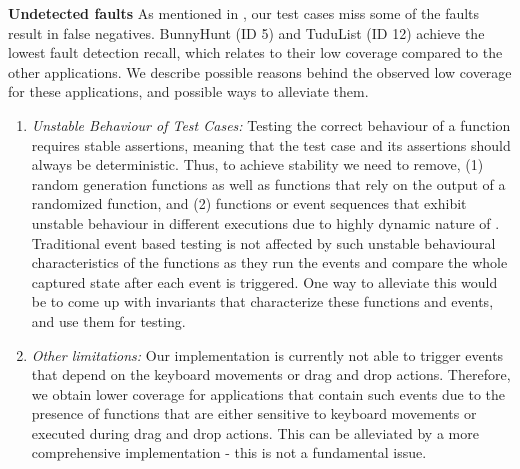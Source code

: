 \textbf{Undetected faults} As mentioned in , our test cases miss some of the faults \ie result in false negatives. 
BunnyHunt (ID 5) and TuduList (ID 12) achieve the lowest fault detection recall, which relates to their low coverage compared to the other applications. 
We describe possible reasons behind the observed low coverage for these applications, and possible ways to alleviate them.  
\begin{enumerate}
\item \textit{Unstable Behaviour of Test Cases:} Testing the correct behaviour of a function requires stable assertions, meaning that
 the test case and its assertions should always be deterministic. 
Thus, to achieve stability we need to remove, (1)  random generation functions as well as functions that rely on the output of a randomized function, and (2) functions or event sequences that exhibit unstable behaviour in different executions due to highly dynamic nature of \javascript. 
Traditional event based testing is not affected by such unstable behavioural characteristics of the functions as they run the events and compare the whole captured state after each event is triggered. One way to alleviate this would be to come up with invariants that characterize these functions and events, and use them for testing.

\item \textit{Other limitations:} Our implementation is currently not able to trigger events that depend on the keyboard movements or drag and drop actions. 
Therefore, we obtain lower coverage for applications that contain such events due to the presence of functions that are either sensitive to keyboard movements or executed during drag and drop actions. This can be alleviated by a more comprehensive implementation - this is not a fundamental issue.
\end{enumerate}  


      